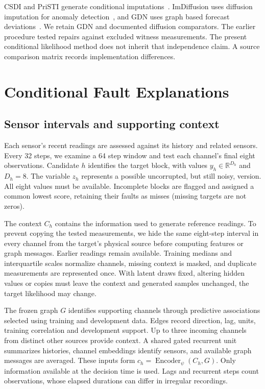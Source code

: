 \documentclass{llncs}
\newcommand{\1}{\mathbf{1}}
\begin{document}
CSDI and PriSTI generate conditional imputations~\cite{csdi,pristi}. ImDiffusion uses diffusion imputation for anomaly detection~\cite{imdiffusion}, and GDN uses graph based forecast deviations~\cite{gdn}. We retain GDN and documented diffusion comparators. The earlier procedure tested repairs against excluded witness measurements. The present conditional likelihood method does not inherit that independence claim. A source comparison matrix records implementation differences.





\section{Conditional Fault Explanations}

\subsection{Sensor intervals and supporting context}
Each sensor's recent readings are assessed against its history and related sensors. Every 32 steps, we examine a 64 step window and test each channel's final eight observations. Candidate $h$ identifies the target block, with values $y_h\in\mathbb R^{D_h}$ and $D_h=8$. The variable $z_h$ represents a possible uncorrupted, but still noisy, version. All eight values must be available. Incomplete blocks are flagged and assigned a common lowest score, retaining their faults as misses (missing targets are not zeros).

The context $C_h$ contains the information used to generate reference readings. To prevent copying the tested measurements, we hide the same eight-step interval in every channel from the target's physical source before computing features or graph messages. Earlier readings remain available. Training medians and interquartile scales normalize channels, missing context is masked, and duplicate measurements are represented once. With latent draws fixed, altering hidden values or copies must leave the context and generated samples unchanged, the target likelihood may change.

The frozen graph $G$ identifies supporting channels through predictive associations selected using training and development data. Edges record direction, lag, units, training correlation and development support. Up to three incoming channels from distinct other sources provide context. A shared gated recurrent unit summarizes histories, channel embeddings identify sensors, and available graph messages are averaged. These inputs form $c_h=\operatorname{Encoder}_{\psi}(C_h,G)$. Only information available at the decision time is used. Lags and recurrent steps count observations, whose elapsed durations can differ in irregular recordings.
\end{document}
